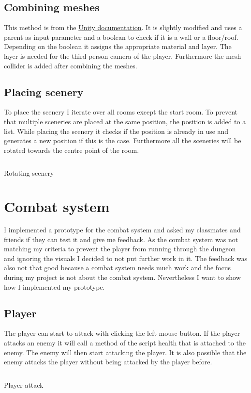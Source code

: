 \documentclass[a4paper,11pt,oneside]{scrreprt}
\begin{document}
\newpage
\subsection{Combining meshes}
\label{subsection:combining-meshes}
This method is from the \href{https://docs.unity3d.com/ScriptReference/Mesh.CombineMeshes.html}{Unity documentation}. It is slightly modified and uses a parent as input parameter and a boolean to check if it is a wall or a floor/roof. 
\\
Depending on the boolean it assigns the appropriate material and layer. The layer is needed for the third person camera of the player. Furthermore the mesh collider is added after combining the meshes.

\subsection{Placing scenery}
\label{subsection:placing-scenery}
To place the scenery I iterate over all rooms except the start room. To prevent that multiple sceneries are placed at the same position, the position is added to a list. While placing the scenery it checks if the position is already in use and generates a new position if this is the case. Furthermore all the sceneries will be rotated towards the centre point of the room.
\begin{listing}[ht]
    \inputminted[fontsize=\footnotesize,linenos]{csharp}{code/Scenery.cs}
    \caption[Rotating scenery]{Rotating scenery}
    \label{code:rotating-scenery}
\end{listing}

\section{Combat system}
\label{section:combat-system}
I implemented a prototype for the combat system and asked my classmates and friends if they can test it and give me feedback. As the combat system was not matching my criteria to prevent the player from running through the dungeon and ignoring the visuals I decided to not put further work in it. The feedback was also not that good because a combat system needs much work and the focus during my project is not about the combat system. Nevertheless I want to show how I implemented my prototype.

\subsection{Player}
\label{subsection:player}
The player can start to attack with clicking the left mouse button. If the player attacks an enemy it will call a method of the script health that is attached to the enemy. The enemy will then start attacking the player. It is also possible that the enemy attacks the player without being attacked by the player before. 
\begin{listing}[ht]
    \inputminted[fontsize=\footnotesize,linenos]{csharp}{code/Player.cs}
    \caption[Player attack]{Player attack}
    \label{code:player-attack}
\end{listing}
\end{document}
